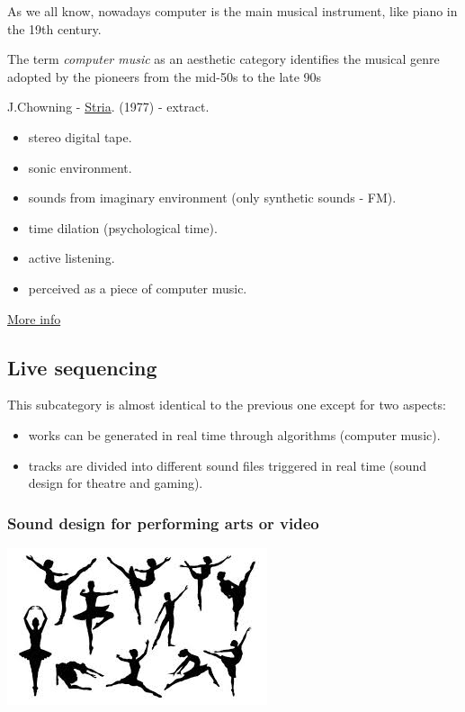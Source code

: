 As we all know, nowadays computer is the main musical instrument, like piano in the 19th century.

The term \textit{computer music} as an aesthetic category identifies the musical genre adopted by the pioneers from the mid-50s to the late 90s

J.Chowning - \href{http://www.musicaecodice.it/gitmedia/emc/2_media/chowning%20.mp3}{Stria}. (1977) - extract.

\begin{itemize}
\tightlist
\item stereo digital tape.
\item sonic environment.
\item sounds from imaginary environment (only synthetic sounds - FM).
\item time dilation (psychological time).
\item active listening.
\item perceived as a piece of computer music.
\end{itemize}

\href{http://www.musicaecodice.it/gitmedia/emc/2_media/max.pdf}{More info}

\subsection{Live sequencing}\label{live-sequencing}

This subcategory is almost identical to the previous one except for two aspects: 

\begin{itemize}
\tightlist
\item works can be generated in real time through algorithms (computer music). 
\item tracks are divided into different sound files triggered in real time (sound design for theatre and gaming).
\end{itemize}

\subsubsection{Sound design for performing arts or video }\label{sound-design-for-performing-arts-or-video}

\begin{center}
\includegraphics[scale=0.4]{../img/danza.png}
\end{center}

